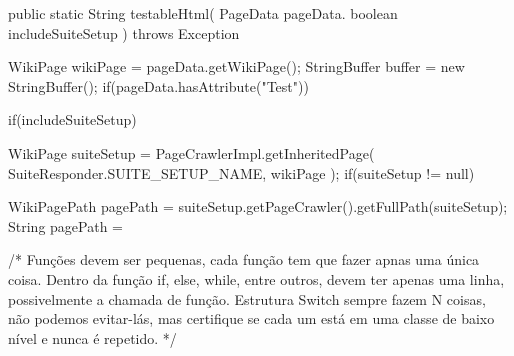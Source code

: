 public static String testableHtml(
	PageData pageData.
	boolean includeSuiteSetup
) throws Exception {
	WikiPage wikiPage = pageData.getWikiPage();
	StringBuffer buffer = new StringBuffer();
	if(pageData.hasAttribute("Test")){
		if(includeSuiteSetup){
			WikiPage suiteSetup =
				PageCrawlerImpl.getInheritedPage(
					SuiteResponder.SUITE_SETUP_NAME, wikiPage
		    );
		if(suiteSetup != null){
			WikiPagePath pagePath =
				suiteSetup.getPageCrawler().getFullPath(suiteSetup);
			String pagePath = 
				
		}
		}
	}
}

/*
Funções devem ser pequenas, cada função tem que fazer apnas uma única coisa.
Dentro da função if, else, while, entre outros, devem ter apenas uma linha,
possivelmente a chamada de função. Estrutura Switch sempre fazem N coisas, 
não podemos evitar-lás, mas certifique se cada um está em uma classe de baixo nível e nunca é repetido.
*/

